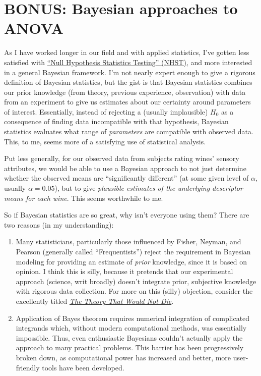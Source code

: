 \documentclass[
]{book}
\makeatletter
\newcommand*\pandocbounded[1]{%
  \sbox\pandoc@box{#1}%
  \Gscale@div\@tempa{\textheight}{\dimexpr\ht\pandoc@box+\dp\pandoc@box\relax}%
  \Gscale@div\@tempb{\linewidth}{\wd\pandoc@box}%
  \ifdim\@tempb\p@<\@tempa\p@\let\@tempa\@tempb\fi%
  \ifdim\@tempa\p@<\p@\scalebox{\@tempa}{\usebox\pandoc@box}%
  \else\usebox{\pandoc@box}%
  \fi%
}
\providecommand{\tightlist}{%
  \setlength{\itemsep}{0pt}\setlength{\parskip}{0pt}}
\makeatother
\begin{document}
\pandocbounded{\texttt{[image: 02-ANOVA\_files/figure-latex/unnamed-chunk-15-1.pdf]}}

\section{BONUS: Bayesian approaches to ANOVA}\label{bonus-bayesian-approaches-to-anova}

As I have worked longer in our field and with applied statistics, I've gotten less satisfied with \href{https://link.springer.com/article/10.3758/s13423-016-1221-4}{``Null Hypothesis Statistics Testing'' (NHST)}, and more interested in a general Bayesian framework. I'm not nearly expert enough to give a rigorous definition of Bayesian statistics, but the gist is that Bayesian statistics combines our prior knowledge (from theory, previous experience, observation) with data from an experiment to give us estimates about our certainty around parameters of interest. Essentially, instead of rejecting a (usually implausible) \(H_0\) as a consequence of finding data incompatible with that hypothesis, Bayesian statistics evaluates what range of \emph{parameters} are compatible with observed data. This, to me, seems more of a satisfying use of statistical analysis.

Put less generally, for our observed data from subjects rating wines' sensory attributes, we would be able to use a Bayesian approach to not just determine whether the observed means are ``significantly different'' (at some given level of \(\alpha\), usually \(\alpha=0.05\)), but to give \emph{plausible estimates of the underlying descriptor means for each wine}. This seems worthwhile to me.

So if Bayesian statistics are so great, why isn't everyone using them? There are two reasons (in my understanding):

\begin{enumerate}
\def\labelenumi{\arabic{enumi}.}
\tightlist
\item
  Many statisticians, particularly those influenced by Fisher, Neyman, and Pearson (generally called ``Frequentists'') reject the requirement in Bayesian modeling for providing an estimate of \emph{prior} knowledge, since it is based on opinion. I think this is silly, because it pretends that our experimental approach (science, writ broadly) doesn't integrate prior, subjective knowledge with rigorous data collection. For more on this (silly) objection, consider the excellently titled \href{https://yalebooks.yale.edu/book/9780300188226/the-theory-that-would-not-die/}{\emph{The Theory That Would Not Die}}.
\item
  Application of Bayes theorem requires numerical integration of complicated integrands which, without modern computational methods, was essentially impossible. Thus, even enthusiastic Bayesians couldn't actually apply the approach to many practical problems. This barrier has been progressively broken down, as computational power has increased and better, more user-friendly tools have been developed.
\end{enumerate}
\end{document}
